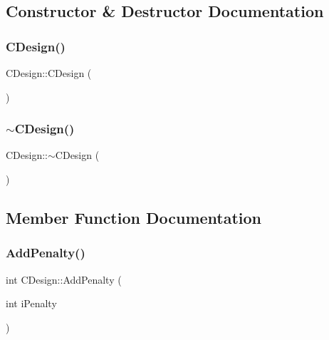 \subsection{Constructor \& Destructor Documentation}
\mbox{\label{classCDesign_a87d140d2c8dbaa85b77f41d7724cc309}} 
\subsubsection{\texorpdfstring{CDesign()}{CDesign()}}
{\footnotesize\ttfamily C\+Design\+::\+C\+Design (\begin{DoxyParamCaption}{ }\end{DoxyParamCaption})}

\mbox{\label{classCDesign_a230641b0a13390b934de6ff40b869e01}} 
\subsubsection{\texorpdfstring{$\sim$CDesign()}{~CDesign()}}
{\footnotesize\ttfamily C\+Design\+::$\sim$\+C\+Design (\begin{DoxyParamCaption}{ }\end{DoxyParamCaption})\hspace{0.3cm}{\ttfamily [virtual]}}



\subsection{Member Function Documentation}
\mbox{\label{classCDesign_acd0487c3ffd7edf494d4b5d049bd9a3f}} 
\subsubsection{\texorpdfstring{AddPenalty()}{AddPenalty()}}
{\footnotesize\ttfamily int C\+Design\+::\+Add\+Penalty (\begin{DoxyParamCaption}\item[{int}]{i\+Penalty }\end{DoxyParamCaption})}

\mbox{\label{classCDesign_af116ba8573daa936d633b5ea0b005637}} 
